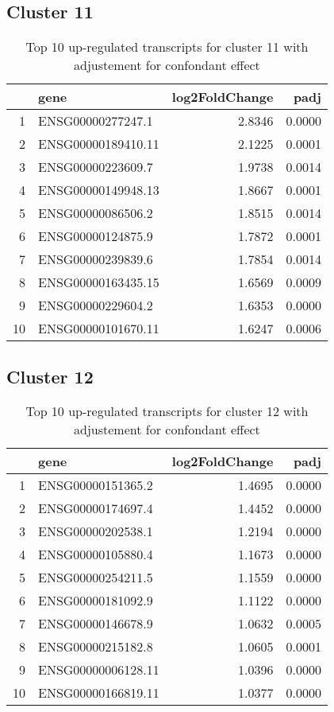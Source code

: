 \documentclass{article}
\begin{document}
\subsection{Cluster 11 }
\begin{table}[H]
\centering
\begin{tabularx}{\textwidth}{rlrr}
  \hline
 & gene & log2FoldChange & padj \\ 
  \hline
1 & ENSG00000277247.1 & 2.8346 & 0.0000 \\ 
  2 & ENSG00000189410.11 & 2.1225 & 0.0001 \\ 
  3 & ENSG00000223609.7 & 1.9738 & 0.0014 \\ 
  4 & ENSG00000149948.13 & 1.8667 & 0.0001 \\ 
  5 & ENSG00000086506.2 & 1.8515 & 0.0014 \\ 
  6 & ENSG00000124875.9 & 1.7872 & 0.0001 \\ 
  7 & ENSG00000239839.6 & 1.7854 & 0.0014 \\ 
  8 & ENSG00000163435.15 & 1.6569 & 0.0009 \\ 
  9 & ENSG00000229604.2 & 1.6353 & 0.0000 \\ 
  10 & ENSG00000101670.11 & 1.6247 & 0.0006 \\ 
   \hline
\end{tabularx}
\caption{Top 10 up-regulated transcripts for cluster 11 with adjustement for confondant effect} 
\label{tab:q3_1_conf_11}
\end{table}
\subsection{Cluster 12 }
\begin{table}[H]
\centering
\begin{tabularx}{\textwidth}{rlrr}
  \hline
 & gene & log2FoldChange & padj \\ 
  \hline
1 & ENSG00000151365.2 & 1.4695 & 0.0000 \\ 
  2 & ENSG00000174697.4 & 1.4452 & 0.0000 \\ 
  3 & ENSG00000202538.1 & 1.2194 & 0.0000 \\ 
  4 & ENSG00000105880.4 & 1.1673 & 0.0000 \\ 
  5 & ENSG00000254211.5 & 1.1559 & 0.0000 \\ 
  6 & ENSG00000181092.9 & 1.1122 & 0.0000 \\ 
  7 & ENSG00000146678.9 & 1.0632 & 0.0005 \\ 
  8 & ENSG00000215182.8 & 1.0605 & 0.0001 \\ 
  9 & ENSG00000006128.11 & 1.0396 & 0.0000 \\ 
  10 & ENSG00000166819.11 & 1.0377 & 0.0000 \\ 
   \hline
\end{tabularx}
\caption{Top 10 up-regulated transcripts for cluster 12 with adjustement for confondant effect} 
\label{tab:q3_1_conf_12}
\end{table}
\end{document}

